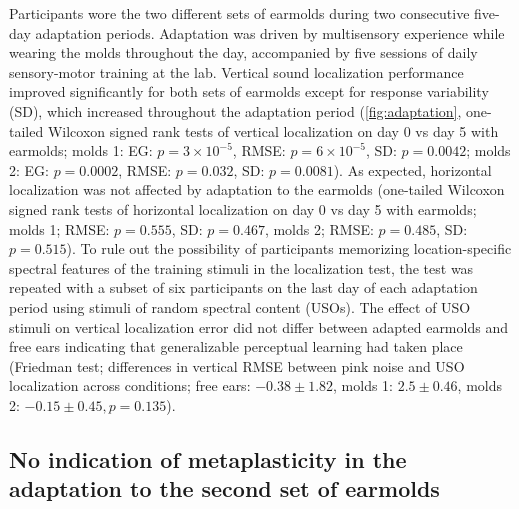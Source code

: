 Participants wore the two different sets of earmolds during two consecutive five-day adaptation periods. Adaptation was driven by multisensory experience while wearing the molds throughout the day, accompanied by five sessions of daily sensory-motor training at the lab. Vertical sound localization performance improved significantly for both sets of earmolds except for response variability (SD), which increased throughout the adaptation period (\cref{fig:adaptation}, one-tailed Wilcoxon signed rank tests of vertical localization on day 0 vs day 5 with earmolds; molds 1: EG: $p = 3 \times 10^{-5}$, RMSE: $p = 6 \times 10^{-5}$, SD: $p = 0.0042$; molds 2: EG: $p = 0.0002$, RMSE: $p = 0.032$, SD: $p = 0.0081$). As expected, horizontal localization was not affected by adaptation to the earmolds (one-tailed Wilcoxon signed rank tests of horizontal localization on day 0 vs day 5 with earmolds; molds 1; RMSE: $p = 0.555$, SD: $p = 0.467$, molds 2; RMSE: $p = 0.485$, SD: $p = 0.515$). %
To rule out the possibility of participants memorizing location-specific spectral features of the training stimuli in the localization test, the test was repeated with a subset of six participants on the last day of each adaptation period using stimuli of random spectral content (USOs). The effect of USO stimuli on vertical localization error did not differ between adapted earmolds and free ears indicating that generalizable perceptual learning had taken place (Friedman test; differences in vertical RMSE between pink noise and USO localization across conditions; free ears: $-0.38 \pm 1.82$, molds 1: $2.5 \pm 0.46$, molds 2: $-0.15 \pm 0.45, p = 0.135$).

\subsection{No indication of metaplasticity in the adaptation to the second set of earmolds}


